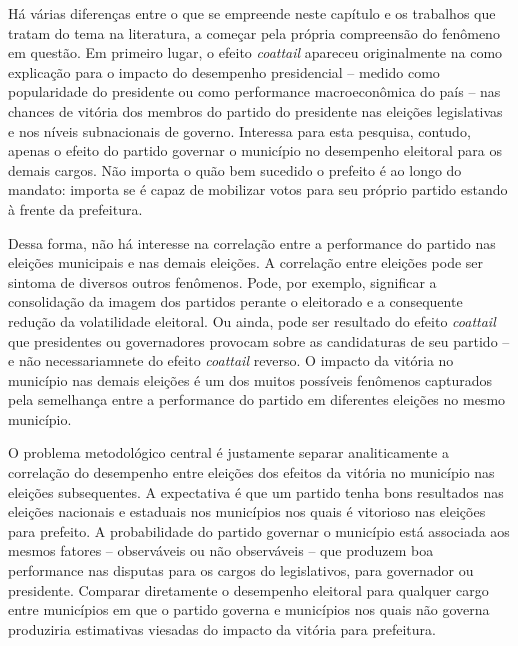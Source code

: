 Há várias diferenças entre o que se empreende neste capítulo e os trabalhos que tratam do tema na literatura, a começar pela própria compreensão do fenômeno em questão. Em primeiro lugar, o efeito \emph{coattail} apareceu originalmente na como explicação para o impacto do desempenho presidencial -- medido como popularidade do presidente ou como performance macroeconômica do país -- nas chances de vitória dos membros do partido do presidente nas eleições legislativas e nos níveis subnacionais de governo. Interessa para esta pesquisa, contudo, apenas o efeito do partido governar o município no desempenho eleitoral para os demais cargos. Não importa o quão bem sucedido o prefeito é ao longo do mandato: importa se é capaz de mobilizar votos para seu próprio partido estando à frente da prefeitura.

Dessa forma, não há interesse na correlação entre a performance do partido nas eleições municipais e nas demais eleições. A correlação entre eleições pode ser sintoma de diversos outros fenômenos. Pode, por exemplo, significar a consolidação da imagem dos partidos perante o eleitorado e a consequente redução da volatilidade eleitoral. Ou ainda, pode ser resultado do efeito \emph{coattail} que presidentes ou governadores provocam sobre as candidaturas de seu partido -- e não necessariamnete do efeito \emph{coattail} reverso. O impacto da vitória no município nas demais eleições é um dos muitos possíveis fenômenos capturados pela semelhança entre a performance do partido em diferentes eleições no mesmo município.

O problema metodológico central é justamente separar analiticamente a correlação do desempenho entre eleições dos efeitos da vitória no município nas eleições subsequentes. A expectativa é que um partido tenha bons resultados nas eleições nacionais e estaduais nos municípios nos quais é vitorioso nas eleições para prefeito. A probabilidade do partido governar o município está associada aos mesmos fatores -- observáveis ou não observáveis -- que produzem boa performance nas disputas para os cargos do legislativos, para governador ou presidente. Comparar diretamente o desempenho eleitoral para qualquer cargo entre municípios em que o partido governa e municípios nos quais não governa produziria estimativas viesadas do impacto da vitória para prefeitura.

